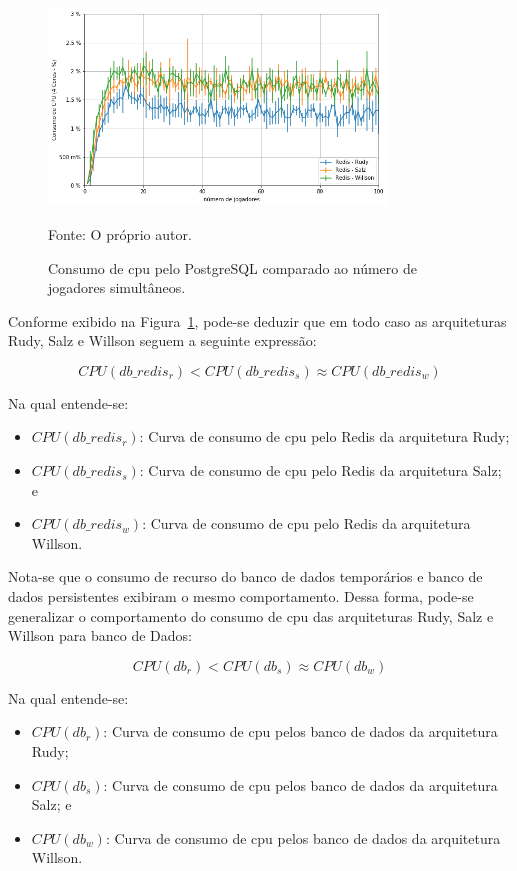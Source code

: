 \begin{figure}[htb!]
  \caption{Consumo de \ac{cpu} pelo PostgreSQL comparado ao número de jogadores simultâneos.}
  \label{fig:cpu_redis_media_por_jogador}
  \includegraphics[width=0.8\textwidth]{figuras/analise/cpu_redis_media_por_jogador.png}
  \centering

  Fonte: O próprio autor.
\end{figure}

Conforme exibido na Figura~\ref{fig:cpu_redis_media_por_jogador}, pode-se deduzir que em todo caso as arquiteturas Rudy, Salz e Willson seguem a seguinte expressão:

$$
    CPU(db\_redis_{r}) < CPU(db\_redis_{s}) \approx CPU(db\_redis_{w})
$$

Na qual entende-se:

\begin{itemize}
\item $CPU(db\_redis_{r})$: Curva de consumo de \ac{cpu} pelo Redis da arquitetura Rudy;
\item $CPU(db\_redis_{s})$: Curva de consumo de \ac{cpu} pelo Redis da arquitetura Salz; e
\item $CPU(db\_redis_{w})$: Curva de consumo de \ac{cpu} pelo Redis da arquitetura Willson.
\end{itemize}

Nota-se que o consumo de recurso do banco de dados temporários e banco de dados persistentes exibiram o mesmo comportamento.
%
Dessa forma, pode-se generalizar o comportamento do consumo de \ac{cpu} das arquiteturas Rudy, Salz e Willson para banco de Dados:

$$
    CPU(db_{r}) < CPU(db_{s}) \approx CPU(db_{w})
$$

Na qual entende-se:

\begin{itemize}
\item $CPU(db_{r})$: Curva de consumo de \ac{cpu} pelos banco de dados da arquitetura Rudy;
\item $CPU(db_{s})$: Curva de consumo de \ac{cpu} pelos banco de dados da arquitetura Salz; e
\item $CPU(db_{w})$: Curva de consumo de \ac{cpu} pelos banco de dados da arquitetura Willson.
\end{itemize}

